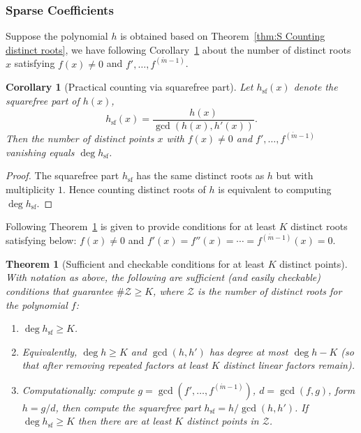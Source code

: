 \documentclass[11pt]{article}
\newtheorem{theorem}{Theorem}
\newtheorem{corollary}{Corollary}
\begin{document}
\subsubsection{Sparse Coefficients}

Suppose the polynomial $h$ is obtained based on Theorem~\ref{thm:S Counting distinct roots}, we have following Corollary~\ref{cor:Practical counting via squarefree part} about the number of distinct roots $x$ satisfying  \(f(x)\neq0\) and \(f',\dots,f^{(\acute{m}-1)}\).

\begin{corollary}[Practical counting via squarefree part]\label{cor:Practical counting via squarefree part}
Let \(h_{\mathrm{sf}}(x)\) denote the squarefree part of \(h(x)\),
\[
h_{\mathrm{sf}}(x)=\frac{h(x)}{\gcd(h(x),h'(x))}.
\]
Then the number of distinct points \(x\) with \(f(x)\neq0\) and \(f',\dots,f^{(\acute{m}-1)}\) vanishing equals \(\deg h_{\mathrm{sf}}\).
\end{corollary}

\begin{proof}
The squarefree part \(h_{\mathrm{sf}}\) has the same distinct roots as \(h\) but with multiplicity \(1\). Hence counting distinct roots of \(h\) is equivalent to computing \(\deg h_{\mathrm{sf}}\).
\end{proof}

Following Theorem~\ref{thm:Sufficient and checkable conditions for at least K distinct points} is given to provide conditions for at least $K$ distinct roots satisfying below:  $f(x)\neq 0$ and $f'(x)=f''(x)=\cdots=f^{(\acute{m}-1)}(x)=0$. 

\begin{theorem}[Sufficient and checkable conditions for at least \(K\) distinct points]\label{thm:Sufficient and checkable conditions for at least K distinct points}
With notation as above, the following are sufficient (and easily checkable) conditions that guarantee \(\#\mathcal{Z}\ge K\), where $\mathcal{Z}$ is the number of distinct roots for the polynomial $f$:
\begin{enumerate}
  \item \(\deg h_{\mathrm{sf}}\ge K\).
  \item Equivalently, \(\deg h \ge K\) and \(\gcd(h,h')\) has degree at most \(\deg h-K\) (so that after removing repeated factors at least \(K\) distinct linear factors remain).
  \item Computationally: compute \(g=\gcd(f',\dots,f^{(\acute{m}-1)})\), \(d=\gcd(f,g)\), form \(h=g/d\), then compute the squarefree part \(h_{\mathrm{sf}}=h/\gcd(h,h')\). If \(\deg h_{\mathrm{sf}}\ge K\) then there are at least \(K\) distinct points in \(\mathcal{Z}\).
\end{enumerate}
\end{theorem}
\end{document}
